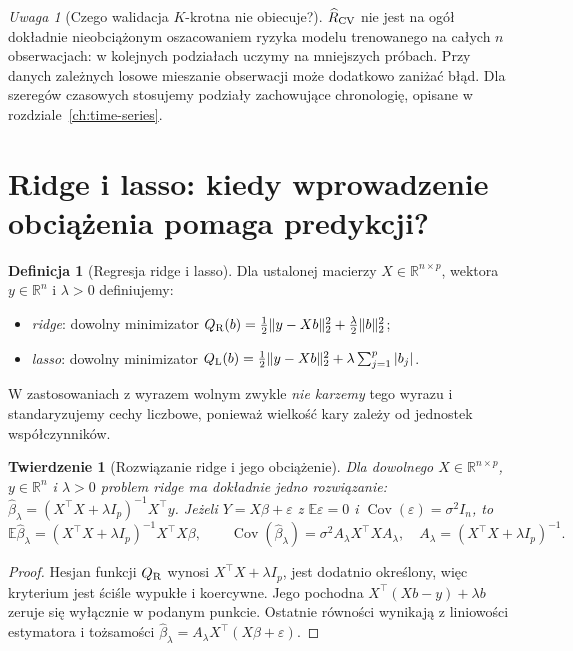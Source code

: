 \documentclass[11pt,a4paper,oneside]{report}
\numberwithin{equation}{chapter}
\theoremstyle{plain}
\newtheorem{twierdzenie}{Twierdzenie}[chapter]
\theoremstyle{definition}
\newtheorem{definicja}{Definicja}[chapter]
\theoremstyle{remark}
\newtheorem{uwaga}{Uwaga}[chapter]
\newcommand{\R}{\mathbb R}
\newcommand{\E}{\mathbb E}
\newcommand{\Cov}{\operatorname{Cov}}
\begin{document}
\begin{uwaga}[Czego walidacja $K$-krotna nie obiecuje?]
$\widehat R_{\rm CV}$ nie jest na ogół dokładnie
nieobciążonym oszacowaniem ryzyka modelu trenowanego
na całych $n$ obserwacjach: w kolejnych podziałach
uczymy na mniejszych próbach. Przy danych zależnych
losowe mieszanie obserwacji może dodatkowo zaniżać błąd.
Dla szeregów czasowych stosujemy podziały zachowujące
chronologię, opisane w rozdziale~\ref{ch:time-series}.
\end{uwaga}

\section{Ridge i lasso: kiedy wprowadzenie obciążenia pomaga predykcji?}
\begin{definicja}[Regresja ridge i lasso]
Dla ustalonej macierzy $X\in\R^{n\times p}$, wektora
$y\in\R^n$ i $\lambda>0$ definiujemy:
\begin{itemize}
\item \emph{ridge}: dowolny minimizator
$Q_{\rm R}(b)=\frac12\|y-Xb\|_2^2+\frac\lambda2\|b\|_2^2$;
\item \emph{lasso}: dowolny minimizator
$Q_{\rm L}(b)=\frac12\|y-Xb\|_2^2+\lambda\sum_{j=1}^p|b_j|$.
\end{itemize}
W zastosowaniach z wyrazem wolnym zwykle \emph{nie karzemy}
tego wyrazu i standaryzujemy cechy liczbowe, ponieważ
wielkość kary zależy od jednostek współczynników.
\end{definicja}

\begin{twierdzenie}[Rozwiązanie ridge i jego obciążenie]
\label{thm:ridge}
Dla dowolnego $X\in\R^{n\times p}$, $y\in\R^n$
i $\lambda>0$ problem ridge ma dokładnie jedno rozwiązanie:
$\widehat\beta_\lambda=(X^\top X+\lambda I_p)^{-1}X^\top y$.
Jeżeli $Y=X\beta+\varepsilon$ z $\E\varepsilon=0$
i $\Cov(\varepsilon)=\sigma^2I_n$, to
\[
 \E\widehat\beta_\lambda=(X^\top X+\lambda I_p)^{-1}
 X^\top X\beta,
 \qquad
 \Cov(\widehat\beta_\lambda)=\sigma^2A_\lambda X^\top X A_\lambda,
 \quad A_\lambda=(X^\top X+\lambda I_p)^{-1}.
\]
\end{twierdzenie}
\begin{proof}
Hesjan funkcji $Q_{\rm R}$ wynosi
$X^\top X+\lambda I_p$, jest dodatnio określony, więc
kryterium jest ściśle wypukłe i koercywne.
Jego pochodna $X^\top(Xb-y)+\lambda b$ zeruje się
wyłącznie w podanym punkcie. Ostatnie równości
wynikają z liniowości estymatora i tożsamości
$\widehat\beta_\lambda=A_\lambda X^\top(X\beta+\varepsilon)$.
\end{proof}
\end{document}
